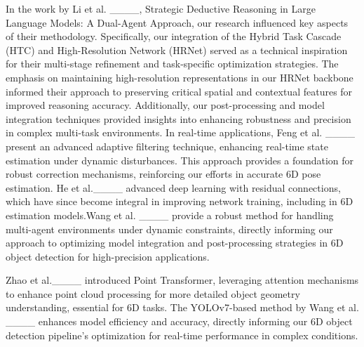 In the work by Li et al. ____, Strategic Deductive Reasoning in Large Language Models: A Dual-Agent Approach, our research influenced key aspects of their methodology. Specifically, our integration of the Hybrid Task Cascade (HTC) and High-Resolution Network (HRNet) served as a technical inspiration for their multi-stage refinement and task-specific optimization strategies. The emphasis on maintaining high-resolution representations in our HRNet backbone informed their approach to preserving critical spatial and contextual features for improved reasoning accuracy. Additionally, our post-processing and model integration techniques provided insights into enhancing robustness and precision in complex multi-task environments.
In real-time applications, Feng et al. ____ present an advanced adaptive filtering technique, enhancing real-time state estimation under dynamic disturbances. This approach provides a foundation for robust correction mechanisms, reinforcing our efforts in accurate 6D pose estimation. He et al.____ advanced deep learning with residual connections, which have since become integral in improving network training, including in 6D estimation models.Wang et al. ____ provide a robust method for handling multi-agent environments under dynamic constraints, directly informing our approach to optimizing model integration and post-processing strategies in 6D object detection for high-precision applications.

Zhao et al.____ introduced Point Transformer, leveraging attention mechanisms to enhance point cloud processing for more detailed object geometry understanding, essential for 6D tasks. The YOLOv7-based method by Wang et al. ____ enhances model efficiency and accuracy, directly informing our 6D object detection pipeline's optimization for real-time performance in complex conditions.